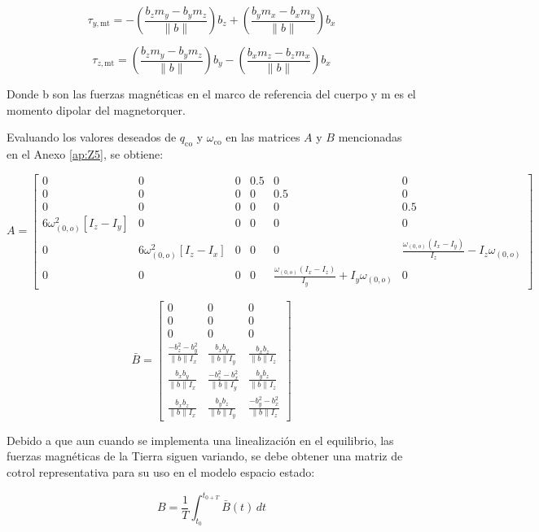 \begin{equation}
	\tau_{y,\text{mt}} = -\left( \frac{b_z m_y - b_y m_z}{\|b\|} \right) b_z + \left( \frac{b_y m_x - b_x m_y}{\|b\|} \right) b_x
	\label{eq:MT_y}
\end{equation}

\begin{equation}
	\tau_{z,\text{mt}} = \left( \frac{b_z m_y - b_y m_z}{\|b\|} \right) b_y - \left( \frac{b_x m_z - b_z m_x}{\|b\|} \right) b_x
	\label{eq:MT_z}
\end{equation}

Donde b son las fuerzas magnéticas en el marco de referencia del cuerpo y m es el momento dipolar del magnetorquer.

Evaluando los valores deseados de $q_{\text{co}}$ y $\omega_{\text{co}}$ en las matrices $A$ y $B$ mencionadas en el Anexo \ref{ap:Z5}, se obtiene:

\[
	A = \begin{bmatrix}
		0 & 0 & 0 & 0.5 & 0 & 0 \\
		0 & 0 & 0 & 0 & 0.5 & 0 \\
		0 & 0 & 0 & 0 & 0 & 0.5 \\
		6\omega_{(0,o)}^2 [I_z - I_y] & 0 & 0 & 0 & 0 & 0 \\
		0 & 6\omega_{(0,o)}^2 [I_z - I_x] & 0 & 0 & 0 & \frac{\omega_{(0,o)} (I_x - I_y)}{I_z} - I_z \omega_{(0,o)} \\
		0 & 0 & 0 & 0 & \frac{\omega_{(0,o)} (I_x - I_z)}{I_y} + I_y \omega_{(0,o)} & 0
	\end{bmatrix}
\]

\[
	\bar{B} = \begin{bmatrix}
		0 & 0 & 0 \\
		0 & 0 & 0 \\
		0 & 0 & 0 \\
		\frac{-b_z^2 - b_y^2}{\|b\| I_x} & \frac{b_x b_y}{\|b\| I_y} & \frac{b_x b_z}{\|b\| I_z} \\
		\frac{b_x b_y}{\|b\| I_x} & \frac{-b_z^2 - b_x^2}{\|b\| I_y} & \frac{b_y b_z}{\|b\| I_z} \\
		\frac{b_x b_z}{\|b\| I_x} & \frac{b_y b_z}{\|b\| I_y} & \frac{-b_y^2 - b_x^2}{\|b\| I_z}
	\end{bmatrix}
\]

Debido a que aun cuando se implementa una linealización en el equilibrio, las fuerzas magnéticas de la Tierra siguen variando, se debe obtener una matriz de cotrol representativa para su uso en el modelo espacio estado:

\[
	B = \frac{1}{T} \int_{t_0}^{t_{0+T}} \bar{B}(t) \, dt
\]

